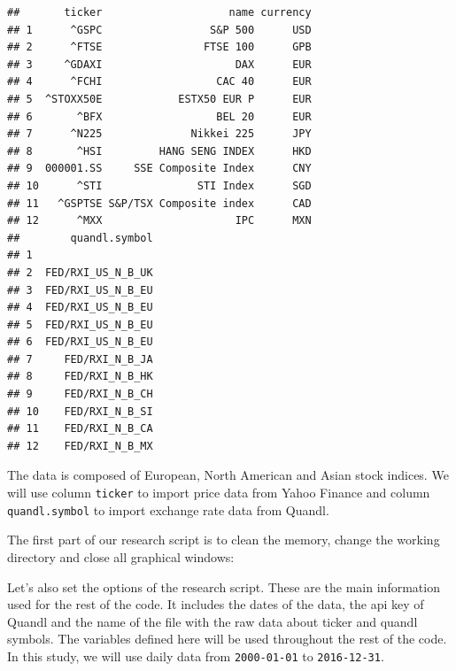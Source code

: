 \documentclass[11pt,]{book}
\newenvironment{Shaded}{\begin{snugshade}}{\end{snugshade}}
\newcommand{\KeywordTok}[1]{\textcolor[rgb]{0.27,0.27,0.27}{\textbf{#1}}}
\newcommand{\DataTypeTok}[1]{\textcolor[rgb]{0.27,0.27,0.27}{#1}}
\newcommand{\StringTok}[1]{\textcolor[rgb]{0.5,0.5,0.5}{#1}}
\newcommand{\CommentTok}[1]{\textcolor[rgb]{0.56,0.35,0.01}{\textit{#1}}}
\newcommand{\OperatorTok}[1]{\textcolor[rgb]{0.81,0.36,0.00}{\textbf{#1}}}
\newcommand{\NormalTok}[1]{#1}
\begin{document}
\begin{verbatim}
##       ticker                    name currency
## 1      ^GSPC                 S&P 500      USD
## 2      ^FTSE                FTSE 100      GPB
## 3     ^GDAXI                     DAX      EUR
## 4      ^FCHI                  CAC 40      EUR
## 5  ^STOXX50E            ESTX50 EUR P      EUR
## 6       ^BFX                  BEL 20      EUR
## 7      ^N225              Nikkei 225      JPY
## 8       ^HSI         HANG SENG INDEX      HKD
## 9  000001.SS     SSE Composite Index      CNY
## 10      ^STI               STI Index      SGD
## 11   ^GSPTSE S&P/TSX Composite index      CAD
## 12      ^MXX                     IPC      MXN
##        quandl.symbol
## 1                   
## 2  FED/RXI_US_N_B_UK
## 3  FED/RXI_US_N_B_EU
## 4  FED/RXI_US_N_B_EU
## 5  FED/RXI_US_N_B_EU
## 6  FED/RXI_US_N_B_EU
## 7     FED/RXI_N_B_JA
## 8     FED/RXI_N_B_HK
## 9     FED/RXI_N_B_CH
## 10    FED/RXI_N_B_SI
## 11    FED/RXI_N_B_CA
## 12    FED/RXI_N_B_MX
\end{verbatim}

The data is composed of European, North American and Asian stock
indices. We will use column \texttt{ticker} to import price data from
Yahoo Finance and column \texttt{quandl.symbol} to import exchange rate
data from Quandl.

The first part of our research script is to clean the memory, change the
working directory and close all graphical windows:

\begin{Shaded}
\end{Shaded}

Let's also set the options of the research script. These are the main
information used for the rest of the code. It includes the dates of the
data, the api key of Quandl and the name of the file with the raw data
about ticker and quandl symbols. The variables defined here will be used
throughout the rest of the code. In this study, we will use daily data
from \texttt{2000-01-01} to \texttt{2016-12-31}.
\end{document}
